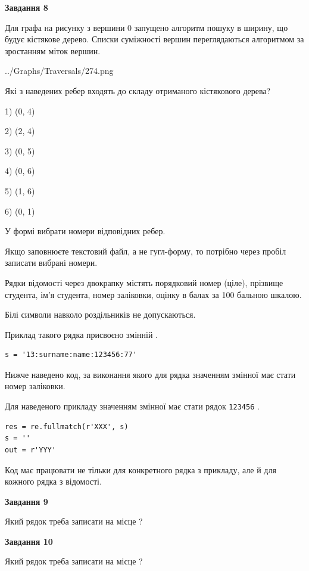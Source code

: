 \documentclass[12pt, ukrainian]{article}
\def\code#1{\Verb!#1!}
\begin{document}
{\begin {large}
{\begin {center}\textbf{Завдання 8}\end {center}}\par
Для графа на рисунку з вершини 0 запущено алгоритм пошуку в ширину, що будує кістякове дерево. Списки суміжності вершин переглядаються алгоритмом за зростанням міток вершин.\par
\begin{center}
	{../Graphs/Traversals/274.png}
\end{center}
\par Які з наведених ребер входять до складу отриманого кістякового дерева?\par
1) (0, 4)\par
2) (2, 4)\par
3) (0, 5)\par
4) (0, 6)\par
5) (1, 6)\par
6) (0, 1)\par
{\vskip 15pt} У формі вибрати номери відповідних ребер.


Якщо заповнюєте текстовий файл, а не гугл-форму, то потрібно через пробіл записа\-ти вибрані номери.\par
\newpage


Рядки відомості через двокрапку містять порядковий номер (ціле), пріз\-ви\-ще студен\-та, ім'я студента, номер заліковки, оцінку в балах за 100 бальною шкалою.

Білі символи навколо роздільників не допускаються.

Приклад такого рядка присвоєно змінній .



\begin{verbatim}
s = '13:surname:name:123456:77'
\end{verbatim}


Нижче наведено код, за виконання якого для рядка  значенням змінної  має стати номер заліковки.

Для наведеного прикладу значенням змінної  має стати рядок \code{123456} .



\begin{verbatim}
res = re.fullmatch(r'XXX', s)
s = ''
out = r'YYY'
\end{verbatim}


Код має працювати не тільки для конкретного рядка з прикладу, але й для кожного рядка з відомості.

{\begin {center}\textbf{Завдання 9}\end {center}}\par
Який рядок треба записати на місце  ?\par
\vspace{5mm}


{\begin {center}\textbf{Завдання 10}\end {center}}\par
Який рядок треба записати на місце  ?\par


\newpage


\end {large}}
\end{document}

